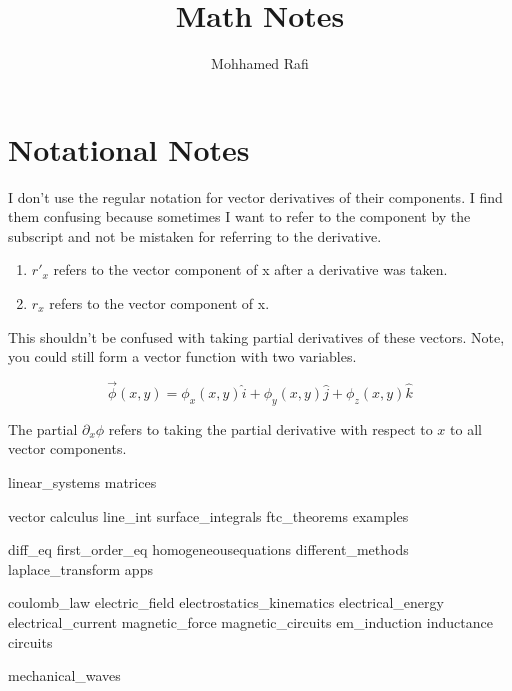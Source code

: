 \documentclass[oneside]{mathnotes}
\title{Math Notes}
\author{Mohhamed Rafi}
\begin{document}
	\maketitle
	\tableofcontents\thispagestyle{fancy}
	\pagebreak

	\section*{Notational Notes}
	I don't use the regular notation for vector derivatives of their components. I find them confusing because sometimes I want to refer to the component by the subscript and not be mistaken for referring to the derivative.

	\begin{enumerate}
	\item $r'_x$ refers to the vector component of x after a derivative was taken.
	\item $r_x$ refers to the vector component of x.
	\end{enumerate}
	This shouldn't be confused with taking partial derivatives of these vectors. Note, you could still form a vector function with two variables. 

	\begin{equation*}
		\vec{\phi}(x,y) = \phi_x(x,y)\hat{i} + \phi_y(x,y)\hat{j} + \phi_z(x,y)\hat{k}
	\end{equation*}

	The partial $\partial_x\phi$ refers to taking the partial derivative with respect to $x$ to all vector components.

	{linear_systems}
	{matrices}


	vector calculus
	{line_int}
	{surface_integrals}
	{ftc_theorems}
	{examples}
	
	{diff_eq}
	{first_order_eq}
	{homogeneousequations}
	{different_methods}
	{laplace_transform}
	{apps}
	


	{coulomb_law}
	{electric_field}
	{electrostatics_kinematics}
	{electrical_energy}
	{electrical_current}
	{magnetic_force}
	{magnetic_circuits}
	{em_induction}
	{inductance}
	{circuits}

	{mechanical_waves}
\end{document}
